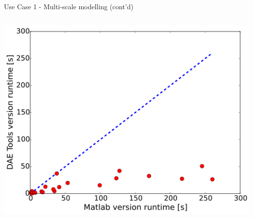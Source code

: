 \documentclass[compress,newPxFont,sthlmFooter]{beamer}
\begin{document}
\begin{frame}{Use Case 1 - Multi-scale modelling (cont'd)}
\begin{columns}[c]
      \begin{column}{0.40\paperwidth}
        \begin{center}
          \includegraphics[align=c, width=\textwidth]{parity_plot.png}
        \end{center}
      \end{column}
    \end{columns}
\end{frame}
\end{document}
